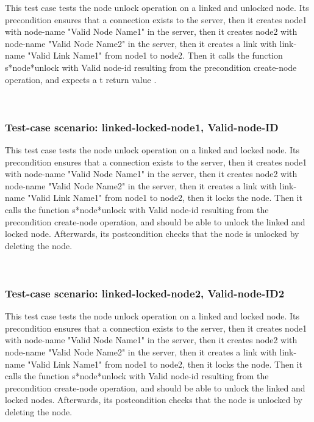 This test case tests the node unlock operation on a linked and unlocked node.
Its precondition ensures that a connection exists to the server, then it creates node1 with node-name "Valid Node Name1" in the server, then it creates node2 with node-name  "Valid Node Name2" in the server, then it creates a link with link-name "Valid Link Name1" from node1 to node2.
Then it calls the function s*node*unlock  with Valid node-id resulting from the precondition create-node operation, and expects a t return value .





\
\subsubsection {Test-case scenario: linked-locked-node1, Valid-node-ID}


This test case tests the node unlock operation on a linked and locked node.
Its precondition ensures that a connection exists to the server, then it creates node1 with node-name "Valid Node Name1" in the server, then it creates node2 with node-name  "Valid Node Name2" in the server, then it creates a link with link-name "Valid Link Name1" from node1 to node2, then it locks the node.
Then it calls the function s*node*unlock  with Valid node-id resulting from the precondition create-node operation, and should be able to unlock the linked and locked node.
Afterwards, its postcondition checks that the node is unlocked by deleting the node.




\
\subsubsection {Test-case scenario: linked-locked-node2, Valid-node-ID2}


This test case tests the node unlock operation on a linked and locked node.
Its precondition ensures that a connection exists to the server, then it creates node1 with node-name "Valid Node Name1" in the server, then it creates node2 with node-name  "Valid Node Name2" in the server, then it creates a link with link-name "Valid Link Name1" from node1 to node2, then it locks the node.
Then it calls the function s*node*unlock  with Valid node-id resulting from the precondition create-node operation, and should be able to unlock the linked and locked nodes.
Afterwards, its postcondition checks that the node is unlocked by deleting the node.


